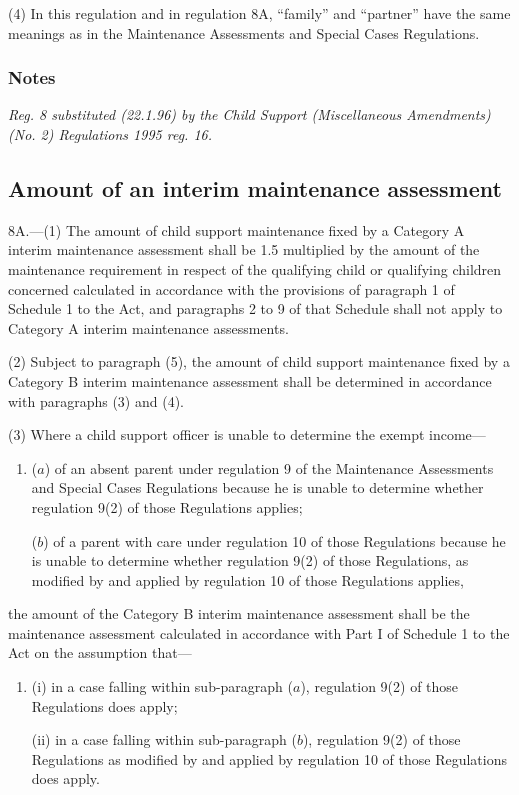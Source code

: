 \documentclass[a4paper]{article}
\newcommand\amendment[1]{\subsubsection*{Notes}{\itshape\frenchspacing\footnotesize #1 \par}}
\begin{document}
(4) In this regulation and in regulation 8A, “family” and “partner” have the same meanings as in the Maintenance Assessments and Special Cases Regulations.

\amendment{
Reg. 8 substituted (22.1.96) by the Child Support (Miscellaneous Amendments) (No. 2) Regulations 1995 reg. 16.
}

\subsection[8A. Amount of an interim maintenance assessment]{Amount of an interim maintenance assessment}

8A.—(1) The amount of child support maintenance fixed by a Category A interim maintenance assessment shall be 1.5 multiplied by the amount of the maintenance requirement in respect of the qualifying child or qualifying children concerned calculated in accordance with the provisions of paragraph 1 of Schedule 1 to the Act, and paragraphs 2 to 9 of that Schedule shall not apply to Category A interim maintenance assessments.

(2) Subject to paragraph (5), the amount of child support maintenance fixed by a Category B interim maintenance assessment shall be determined in accordance with paragraphs (3) and (4).

(3) Where a child support officer is unable to determine the exempt income—
\begin{enumerate}\item[]
($a$) of an absent parent under regulation 9 of the Maintenance Assessments and Special Cases Regulations because he is unable to determine whether regulation 9(2) of those Regulations applies;

($b$) of a parent with care under regulation 10 of those Regulations because he is unable to determine whether regulation 9(2) of those Regulations, as modified by and applied by regulation 10 of those Regulations applies,
\end{enumerate}
the amount of the Category B interim maintenance assessment shall be the maintenance assessment calculated in accordance with Part I of Schedule 1 to the Act on the assumption that—
\begin{enumerate}\item[]
(i) in a case falling within sub-paragraph ($a$), regulation 9(2) of those Regulations does apply;

(ii) in a case falling within sub-paragraph ($b$), regulation 9(2) of those Regulations as modified by and applied by regulation 10 of those Regulations does apply.
\end{enumerate}
\end{document}
